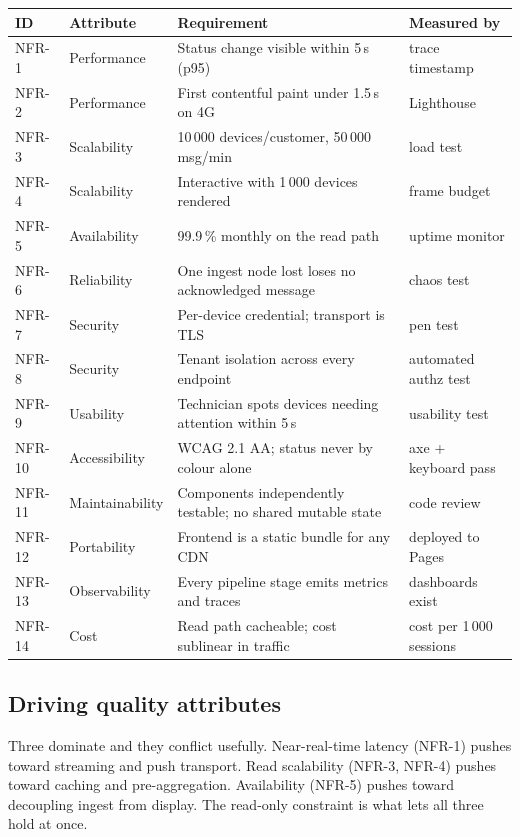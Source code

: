 \documentclass[11pt,a4paper]{article}
\begin{document}
\begin{center}
\small
\begin{tabularx}{\textwidth}{@{}l l X l@{}}
\toprule
\textbf{ID} & \textbf{Attribute} & \textbf{Requirement} & \textbf{Measured by} \\
\midrule
NFR-1  & Performance     & Status change visible within 5\,s (p95) & trace timestamp \\
NFR-2  & Performance     & First contentful paint under 1.5\,s on 4G & Lighthouse \\
NFR-3  & Scalability     & 10\,000 devices/customer, 50\,000 msg/min & load test \\
NFR-4  & Scalability     & Interactive with 1\,000 devices rendered & frame budget \\
NFR-5  & Availability    & 99.9\,\% monthly on the read path & uptime monitor \\
NFR-6  & Reliability     & One ingest node lost loses no acknowledged message & chaos test \\
NFR-7  & Security        & Per-device credential; transport is TLS & pen test \\
NFR-8  & Security        & Tenant isolation across every endpoint & automated authz test \\
NFR-9  & Usability       & Technician spots devices needing attention within 5\,s & usability test \\
NFR-10 & Accessibility   & WCAG 2.1 AA; status never by colour alone & axe + keyboard pass \\
NFR-11 & Maintainability & Components independently testable; no shared mutable state & code review \\
NFR-12 & Portability     & Frontend is a static bundle for any CDN & deployed to Pages \\
NFR-13 & Observability   & Every pipeline stage emits metrics and traces & dashboards exist \\
NFR-14 & Cost            & Read path cacheable; cost sublinear in traffic & cost per 1\,000 sessions \\
\bottomrule
\end{tabularx}
\end{center}

\subsection*{Driving quality attributes}

Three dominate and they conflict usefully. Near-real-time latency (NFR-1) pushes
toward streaming and push transport. Read scalability (NFR-3, NFR-4) pushes toward
caching and pre-aggregation. Availability (NFR-5) pushes toward decoupling ingest
from display. The read-only constraint is what lets all three hold at once.
\end{document}
